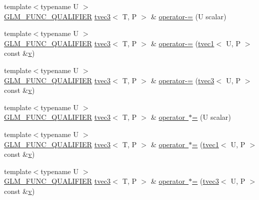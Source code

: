 \begin{DoxyCompactItemize}
\item 
{\footnotesize template$<$typename U $>$ }\\\mbox{\hyperlink{setup_8hpp_a33fdea6f91c5f834105f7415e2a64407}{G\+L\+M\+\_\+\+F\+U\+N\+C\+\_\+\+Q\+U\+A\+L\+I\+F\+I\+ER}} \mbox{\hyperlink{structglm_1_1tvec3}{tvec3}}$<$ T, P $>$ \& \mbox{\hyperlink{structglm_1_1tvec3_aa8e58a178c28d5e2283600de3cfed096}{operator-\/=}} (U scalar)
\item 
{\footnotesize template$<$typename U $>$ }\\\mbox{\hyperlink{setup_8hpp_a33fdea6f91c5f834105f7415e2a64407}{G\+L\+M\+\_\+\+F\+U\+N\+C\+\_\+\+Q\+U\+A\+L\+I\+F\+I\+ER}} \mbox{\hyperlink{structglm_1_1tvec3}{tvec3}}$<$ T, P $>$ \& \mbox{\hyperlink{structglm_1_1tvec3_a5faeb262b3d7bdc7c56fbb582ef6ee5a}{operator-\/=}} (\mbox{\hyperlink{structglm_1_1tvec1}{tvec1}}$<$ U, P $>$ const \&\mbox{\hyperlink{glad_8h_a14cfbe2fc2234f5504618905b69d1e06}{v}})
\item 
{\footnotesize template$<$typename U $>$ }\\\mbox{\hyperlink{setup_8hpp_a33fdea6f91c5f834105f7415e2a64407}{G\+L\+M\+\_\+\+F\+U\+N\+C\+\_\+\+Q\+U\+A\+L\+I\+F\+I\+ER}} \mbox{\hyperlink{structglm_1_1tvec3}{tvec3}}$<$ T, P $>$ \& \mbox{\hyperlink{structglm_1_1tvec3_acec58495abe12a054d93d709f629f3c1}{operator-\/=}} (\mbox{\hyperlink{structglm_1_1tvec3}{tvec3}}$<$ U, P $>$ const \&\mbox{\hyperlink{glad_8h_a14cfbe2fc2234f5504618905b69d1e06}{v}})
\item 
{\footnotesize template$<$typename U $>$ }\\\mbox{\hyperlink{setup_8hpp_a33fdea6f91c5f834105f7415e2a64407}{G\+L\+M\+\_\+\+F\+U\+N\+C\+\_\+\+Q\+U\+A\+L\+I\+F\+I\+ER}} \mbox{\hyperlink{structglm_1_1tvec3}{tvec3}}$<$ T, P $>$ \& \mbox{\hyperlink{structglm_1_1tvec3_aefc18b43268dedd0601aa2a5450bc541}{operator $\ast$=}} (U scalar)
\item 
{\footnotesize template$<$typename U $>$ }\\\mbox{\hyperlink{setup_8hpp_a33fdea6f91c5f834105f7415e2a64407}{G\+L\+M\+\_\+\+F\+U\+N\+C\+\_\+\+Q\+U\+A\+L\+I\+F\+I\+ER}} \mbox{\hyperlink{structglm_1_1tvec3}{tvec3}}$<$ T, P $>$ \& \mbox{\hyperlink{structglm_1_1tvec3_a3944c2ea5161c952d59f123b52308087}{operator $\ast$=}} (\mbox{\hyperlink{structglm_1_1tvec1}{tvec1}}$<$ U, P $>$ const \&\mbox{\hyperlink{glad_8h_a14cfbe2fc2234f5504618905b69d1e06}{v}})
\item 
{\footnotesize template$<$typename U $>$ }\\\mbox{\hyperlink{setup_8hpp_a33fdea6f91c5f834105f7415e2a64407}{G\+L\+M\+\_\+\+F\+U\+N\+C\+\_\+\+Q\+U\+A\+L\+I\+F\+I\+ER}} \mbox{\hyperlink{structglm_1_1tvec3}{tvec3}}$<$ T, P $>$ \& \mbox{\hyperlink{structglm_1_1tvec3_ac4e437eb1d0eb6b56ad3927d1bdc1b0a}{operator $\ast$=}} (\mbox{\hyperlink{structglm_1_1tvec3}{tvec3}}$<$ U, P $>$ const \&\mbox{\hyperlink{glad_8h_a14cfbe2fc2234f5504618905b69d1e06}{v}})

\end{DoxyCompactItemize}

